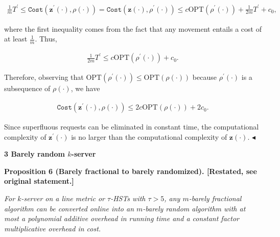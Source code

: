 \documentclass[10pt,a4paper]{article}
\begin{document}
\[\begin{gathered}
\frac{1}{m}T^{\prime}\leq{\texttt{Cost}}({\mathbf{z}}^{\prime}(\cdot),\rho(\cdot))={\texttt{Cost}}({\mathbf{z}}(\cdot),\rho^{\prime}(\cdot))\leq c{\text{OPT}}(\rho^{\prime}(\cdot))+\frac{1}{2m}T^{\prime}+c_{0},
\end{gathered}\]


where the first inequality comes from the fact that any movement entails a cost of at least $\frac{1}{m}$. Thus,\par


\[\begin{gathered}
\frac{1}{2m}T^{\prime}\leq c{\text{OPT}}(\rho^{\prime}(\cdot))+c_{0}.
\end{gathered}\]


Therefore, observing that ${\text{OPT}}(\rho^{\prime}(\cdot))\leq{\text{OPT}}(\rho(\cdot))$ because $\rho^{\prime}(\cdot)$ is a subsequence of $\rho(\cdot)$, we have\par


\[\begin{gathered}
{\texttt{Cost}}({\mathbf{z}}^{\prime}(\cdot),\rho(\cdot))\leq 2c{\text{OPT}}(\rho(\cdot))+2c_{0}.
\end{gathered}\]


Since superfluous requests can be eliminated in constant time, the computational complexity of ${\mathbf{z}}^{\prime}(\cdot)$ is no larger than the computational complexity of ${\mathbf{z}}(\cdot)$.
$\blacktriangleleft$\par






\par\medskip\noindent\textbf{
3 Barely random $k$-server}\par






\par\medskip\noindent\textbf{
\textbf{Proposition 6}\textbf{ }(Barely fractional to barely randomized)\textbf{.}
[Restated, see original statement.]}\par



\emph{For $k$-server on a line metric
or $\tau$-HSTs with $\tau>5$, any $m$-barely fractional algorithm can be converted online into an $m$-barely random algorithm with at most a polynomial additive overhead in running time and a constant factor multiplicative overhead in cost.}\par
\end{document}
